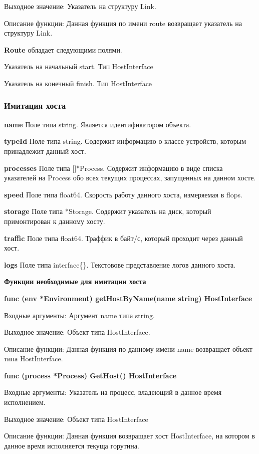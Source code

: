 Выходное значение: Указатель на структуру Link. 

Описание функции: Данная функция по имени route возвращает указатель на структуру Link.


\textbf{Route} обладает следующими полями.

Указатель на начальный	start. Тип  HostInterface

Указатель на конечный finish. Тип HostInterface



\subsubsection{Имитация хоста}
\textbf{name}      
Поле типа string. Является идентификатором объекта.  

\textbf{typeId} 
Поле типа string. Содержит информацию о классе устройств, которым принадлежит данный хост. 

\textbf{processes} 
Поле типа []*Process. Содержит информацию в виде списка указателей на Process обо всех текущих процессах, запущенных на данном хосте. 

\textbf{speed}     
Поле типа float64. Скорость работу данного хоста, измеряемая в flops.

\textbf{storage}   
Поле типа *Storage. Содержит указатель на диск, который примонтирован к данному хосту.

\textbf{traffic} 
Поле типа float64. Траффик в байт/с, который проходит через данный хост.

\textbf{logs} 
Поле типа interface\{\}. Текстовове представление логов данного хоста.

\textbf{Функции необходимые для имитации хоста}

\textbf{func (env *Environment) getHostByName(name string) HostInterface}

Входные аргументы: Аргумент name типа string.

Выходное значение: Объект типа HostInterface.

Описание функции: Данная функция по данному имени name возвращает объект типа HostInterface.


\textbf{func (process *Process) GetHost() HostInterface }

Входные аргументы: Указатель на процесс, владеющий в данное время исполнением.

Выходное значение: Объект типа HostInterface

Описание функции: Данная функция возвращает хост HostInterface, на котором в данное время исполняется текуща горутина. 

